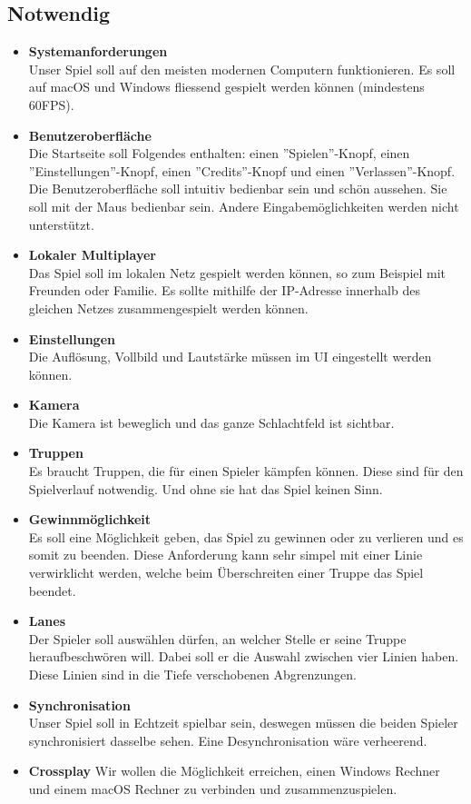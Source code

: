 \subsection{Notwendig}
\begin{itemize}
    \item \textbf{Systemanforderungen} \\
        Unser Spiel soll auf den meisten modernen Computern funktionieren. Es soll auf macOS und
        Windows fliessend gespielt werden können (mindestens 60\gls{FPS}).
    \item \textbf{Benutzeroberfläche} \\
        Die Startseite soll Folgendes enthalten: einen ''Spielen''-Knopf, einen ''Einstellungen''-Knopf, einen
        ''Credits''-Knopf und einen ''Verlassen''-Knopf. Die Benutzeroberfläche soll intuitiv bedienbar sein und
        schön aussehen. Sie soll mit der Maus bedienbar sein. Andere Eingabemöglichkeiten
        werden nicht unterstützt.
    \item \textbf{\gls{Lokal}er Multiplayer} \\
        Das Spiel soll im lokalen Netz gespielt werden können, so zum Beispiel mit Freunden oder Familie.
        Es sollte mithilfe der IP-Adresse innerhalb des gleichen Netzes zusammengespielt werden können.
    \item \textbf{Einstellungen} \\
        Die Auflösung, Vollbild und Lautstärke müssen im UI eingestellt werden können.
    \item \textbf{\gls{Kamera}} \\
        Die Kamera ist beweglich und das ganze Schlachtfeld ist sichtbar.
    \item \textbf{Truppen} \\
        Es braucht Truppen, die für einen Spieler kämpfen können. Diese sind für den Spielverlauf notwendig.
        Und ohne sie hat das Spiel keinen Sinn.
    \item \textbf{Gewinnmöglichkeit} \\
        Es soll eine Möglichkeit geben, das Spiel zu gewinnen oder zu verlieren und es somit zu beenden. Diese Anforderung kann sehr simpel
        mit einer Linie verwirklicht werden, welche beim Überschreiten einer Truppe das Spiel beendet.
    \item \textbf{\glspl{Lane}} \\
        Der Spieler soll auswählen dürfen, an welcher Stelle er seine Truppe heraufbeschwören will. Dabei soll er die Auswahl zwischen vier Linien haben. Diese Linien sind in die Tiefe verschobenen Abgrenzungen.
    \item \textbf{Synchronisation} \\
        Unser Spiel soll in Echtzeit spielbar sein, deswegen müssen die beiden Spieler synchronisiert dasselbe sehen. Eine Desynchronisation wäre verheerend. 
    \item \textbf{\gls{Crossplay}}
        Wir wollen die Möglichkeit erreichen, einen Windows Rechner und einem macOS Rechner zu verbinden und zusammenzuspielen.
\end{itemize}

